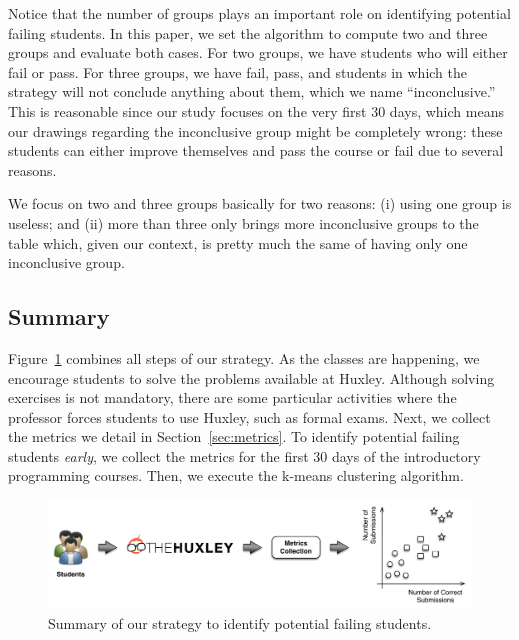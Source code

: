 Notice that the number of groups plays an important role on identifying potential failing students. In this paper, we set the algorithm to compute two and three groups and evaluate both cases. For two groups, we have students who will either fail or pass. For three groups, we have fail, pass, and students in which the strategy will not conclude anything about them, which we name ``inconclusive.'' This is reasonable since our study focuses on the very first 30 days, which means our drawings regarding the inconclusive group might be completely wrong: these students can either improve themselves and pass the course or fail due to several reasons.

We focus on two and three groups basically for two reasons: (i) using one group is useless; and (ii) more than three only brings more inconclusive groups to the table which, given our context, is pretty much the same of having only one inconclusive group.

\subsection{Summary}

Figure~\ref{fig:strategy} combines all steps of our strategy. As the classes are happening, we encourage students to solve the problems available at Huxley. Although solving exercises is not mandatory, there are some particular activities where the professor forces students to use Huxley, such as formal exams. Next, we collect the metrics we detail in Section~\ref{sec:metrics}. To identify potential failing students \textit{early}, we collect the metrics for the first 30 days of the introductory programming courses. Then, we execute the k-means clustering algorithm.

\begin{figure}[htb]
\centering
\includegraphics[width=1.0\textwidth,natwidth=610,natheight=642]{images/Strategy.pdf}
\caption{Summary of our strategy to identify potential failing students.}
\label{fig:strategy}
\end{figure}